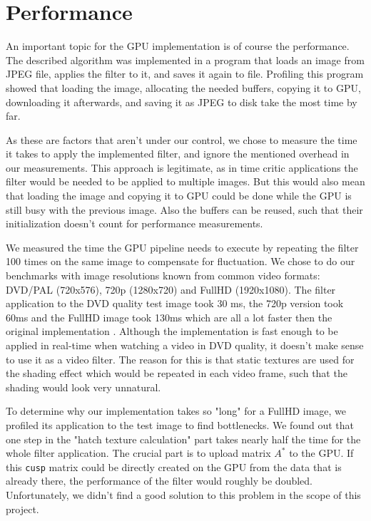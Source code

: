 \section{Performance} \label{performance}
An important topic for the GPU implementation is of course the performance.
The described algorithm was implemented in a program that loads an image
from JPEG file, applies the filter to it, and saves it again to file.
Profiling this program showed that loading the image, allocating the
needed buffers, copying it to GPU, downloading it afterwards, and saving it
as JPEG to disk take the most time by far.

As these are factors that aren't under our control, we chose to measure
the time it takes to apply the implemented filter, and ignore the mentioned
overhead in our measurements. This approach is legitimate, as in time critic
applications the filter would be needed to be applied to multiple images. But this
would also mean that loading the image and copying it to GPU could be done while
the GPU is still busy with the previous image. Also the buffers can be reused,
such that their initialization doesn't count for performance measurements.

We measured the time the GPU pipeline needs to execute by repeating the
filter 100 times on the same image to compensate for fluctuation. We chose to do
our benchmarks with image resolutions known from common video formats:
DVD/PAL (720x576), 720p (1280x720) and FullHD (1920x1080). The filter
application to the DVD quality test image took 30 ms, the 720p version
took 60ms and the FullHD image took 130ms which are all a lot faster
then the original implementation \cite{mainPaper}.
Although the implementation is fast enough to be applied in real-time when watching
a video in DVD quality, it doesn't make sense to use it as a video filter.
The reason for this is that static textures are used for the shading effect
which would be repeated in each video frame, such that the shading would look
very unnatural.

To determine why our implementation takes so "long" for a FullHD image,
we profiled its application to the test image to find bottlenecks. We found out
that one step in the "hatch texture calculation" part takes nearly half the
time for the whole filter application. The crucial part is to upload matrix
$A^*$ to the GPU. If this \texttt{cusp} matrix could be directly created on the
GPU from the data that is already there, the performance of the filter would
roughly be doubled.  Unfortunately, we didn't find a good solution to this problem
in the scope of this project.
